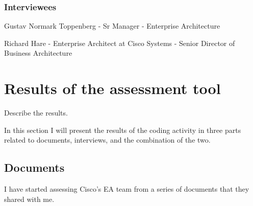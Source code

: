 \subsubsection*{Interviewees}

Gustav Normark Toppenberg - Sr Manager - Enterprise Architecture

Richard Hare - Enterprise Architect at Cisco Systems - Senior Director of Business Architecture


\section{Results of the assessment tool}
Describe the results.

In this section I will present the results of the coding activity in three parts related to documents, interviews, and the combination of the two.

\subsection{Documents}

I have started assessing Cisco's EA team from a series of documents that they shared with me.

